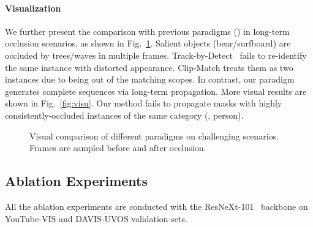 \documentclass[10pt,twocolumn,letterpaper]{article}
\begin{document}
	\paragraph{Visualization} 
	We further present the comparison with previous paradigms (\cite{cao2020sipmask,athar2020stem})  in long-term occlusion scenarios, as shown in Fig.~\ref{fig:vis_paradigm}. Salient objects (bear/surfboard) are occluded by trees/waves in multiple frames. Track-by-Detect~\cite{cao2020sipmask} fails to re-identify the same instance with distorted appearance. Clip-Match \cite{athar2020stem} treats them as two instances due to being out of the matching scopes. In contrast, our paradigm generates complete sequences via long-term propagation. More visual results are shown in Fig.~\ref{fig:visu}. Our method fails to propagate masks with highly consistently-occluded instances of the same category (\ie, person).
	
	
	\begin{figure}[t]
		\begin{center}
		\end{center}
		\vspace{-0.1in}
		\caption{Visual comparison of different paradigms on challenging scenarios. Frames are sampled before and after occlusion. }
		\label{fig:vis_paradigm}
	\end{figure}
	
	\begin{figure*}[t]
		\begin{center}
		\end{center}
		\vspace{-0.1in}
		\caption{Visual results on DAVIS-UVOS and YouTube-VOS. Frames are sampled at challenging moments (\eg, fast motion). We also show in the last row a failure case of overlapped same-category instances, where the arm of one occluded person is segmented to the other. Category `Instance' in DAVIS-UVOS denotes the salient generic object.}
		\label{fig:visu}
		\vspace{-0.05in}
	\end{figure*}
	
	\subsection{Ablation Experiments}\label{Sec:ablation}
	All the ablation experiments are conducted with the ResNeXt-101~\cite{xie2017aggregated} backbone on YouTube-VIS and DAVIS-UVOS validation sets.
	
\end{document}
